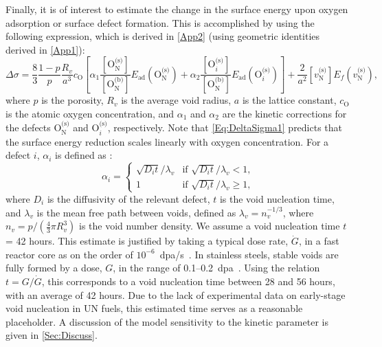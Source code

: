 \documentclass[preprint,12pt,sort&compress]{elsarticle}
\newcommand{\?}{\stackrel{?}{=}}
\begin{document}
Finally, it is of interest to estimate the change in the surface energy upon oxygen adsorption or surface defect formation. This is accomplished by using the following expression, which is derived in \ref{App2} (using geometric identities derived in \ref{App1}):
\begin{equation}
\Delta \sigma = \frac{8}{3} \frac{1-p}{p} \frac{R_v}{a^3} c_\text{O} \left[ \alpha_1 \frac{ [ \text{O}_\text{N}^{\text{(s)}} ] }{ [ \text{O}_\text{N}^{\text{(b)}} ] }  E_\text{ad}( \text{O}_\text{N}^{\text{(s)}} ) + \alpha_2 \frac{ [ \text{O}_i^{\text{(s)}} ] }{ [ \text{O}_\text{N}^{\text{(b)}} ] }  E_\text{ad}( \text{O}_i^{\text{(s)}} ) \right] + \frac{2}{a^2} [ v_\text{N}^{\text{(s)}} ] E_f ( v_\text{N}^{\text{(s)}} ),
\label{Eq:DeltaSigma1}
\end{equation}
where $p$ is the porosity, $R_v$ is the average void radius, $a$ is the lattice constant, $c_\text{O}$ is the atomic oxygen concentration, and $\alpha_1$ and $\alpha_2$ are the kinetic corrections for the defects $\text{O}_\text{N}^\text{(s)}$ and $\text{O}_i^{\text{(s)}}$, respectively. Note that \cref{Eq:DeltaSigma1} predicts that the surface energy reduction scales linearly with oxygen concentration. For a defect $i$, $\alpha_i$ is defined as \cite{Zinkle1990}:
\begin{equation}
\alpha_i =
\begin{cases}
    \sqrt{D_i t}/\lambda_v & \text{if } \sqrt{D_i t}/\lambda_v < 1, \\
    1 & \text{if } \sqrt{D_i t}/\lambda_v \geq 1,
\end{cases}
\label{Eq:alpha}
\end{equation}
where $D_i$ is the diffusivity of the relevant defect, $t$ is the void nucleation time, and $\lambda_v$ is the mean free path between voids, defined as $\lambda_v = n_v^{-1/3}$, where $n_v = p / ( \frac{4}{3} \pi R_v^3 )$ is the void number density. We assume a void nucleation time $t$ = 42 hours. This estimate is justified by taking a typical dose rate, $\dot{G}$, in a fast reactor core as on the order of $10^{-6}$~dpa/s~\cite{Mansur1983, Saha2018}. In stainless steels, stable voids are fully formed by a dose, $G$, in the range of 0.1--0.2~dpa~\cite{Surh2004}. Using the relation $t = G / \dot{G}$, this corresponds to a void nucleation time between 28 and 56 hours, with an average of 42 hours. Due to the lack of experimental data on early-stage void nucleation in UN fuels, this estimated time serves as a reasonable placeholder. A discussion of the model sensitivity to the kinetic parameter is given in \cref{Sec:Discuss}.
\end{document}
